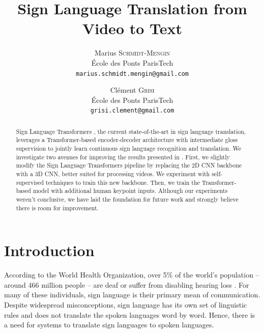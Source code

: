 \documentclass[final]{cvpr}
\begin{document}
\title{Sign Language Translation from Video to Text}

\author{Marius \textsc{Schmidt-Mengin}\\
	École des Ponts ParisTech\\
	{\tt\small marius.schmidt.mengin@gmail.com}
\and
Clément \textsc{Grisi}\\
École des Ponts ParisTech\\
{\tt\small grisi.clement@gmail.com}
}

\maketitle


\begin{abstract}
	Sign Language Transformers \cite{neccam}, the current state-of-the-art in sign language translation, leverages a Transformer-based encoder-decoder architecture with intermediate gloss supervision to jointly learn continuous sign language recognition and translation. We investigate two avenues for improving the results presented in \cite{neccam}. First, we slightly modify the Sign Language Transformers pipeline by replacing the 2D CNN backbone with a 3D CNN, better suited for processing videos. We experiment with self-supervised techniques to train this new backbone. Then, we train the Transformer-based model with additional human keypoint inputs. Although our experiments weren't conclusive, we have laid the foundation for future work and strongly believe there is room for improvement. 
\end{abstract}

\section{Introduction}
According to the World Health Organization, over 5\% of the world’s population -- around 466 million people – are deaf or suffer from disabling hearing loss \cite{WHO}. For many of these individuals, sign language is their primary mean of communication. Despite widespread misconceptions, sign language has its own set of linguistic rules and does not translate the spoken languages word by word. Hence, there is a need for systems to translate sign languages to spoken languages.
\end{document}
